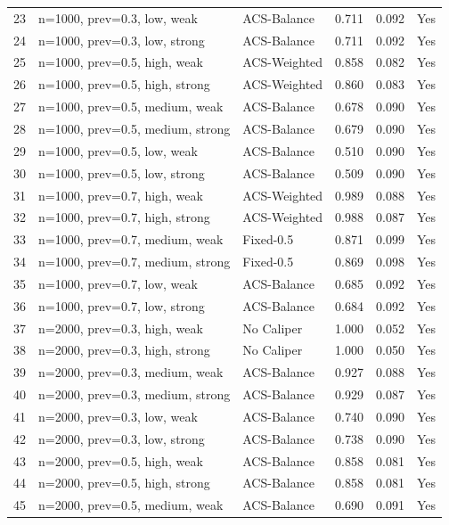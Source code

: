 \begin{tabular}{rlllll}
23 & n=1000, prev=0.3, low, weak & ACS-Balance & 0.711 & 0.092 & Yes \\
24 & n=1000, prev=0.3, low, strong & ACS-Balance & 0.711 & 0.092 & Yes \\
25 & n=1000, prev=0.5, high, weak & ACS-Weighted & 0.858 & 0.082 & Yes \\
26 & n=1000, prev=0.5, high, strong & ACS-Weighted & 0.860 & 0.083 & Yes \\
27 & n=1000, prev=0.5, medium, weak & ACS-Balance & 0.678 & 0.090 & Yes \\
28 & n=1000, prev=0.5, medium, strong & ACS-Balance & 0.679 & 0.090 & Yes \\
29 & n=1000, prev=0.5, low, weak & ACS-Balance & 0.510 & 0.090 & Yes \\
30 & n=1000, prev=0.5, low, strong & ACS-Balance & 0.509 & 0.090 & Yes \\
31 & n=1000, prev=0.7, high, weak & ACS-Weighted & 0.989 & 0.088 & Yes \\
32 & n=1000, prev=0.7, high, strong & ACS-Weighted & 0.988 & 0.087 & Yes \\
33 & n=1000, prev=0.7, medium, weak & Fixed-0.5 & 0.871 & 0.099 & Yes \\
34 & n=1000, prev=0.7, medium, strong & Fixed-0.5 & 0.869 & 0.098 & Yes \\
35 & n=1000, prev=0.7, low, weak & ACS-Balance & 0.685 & 0.092 & Yes \\
36 & n=1000, prev=0.7, low, strong & ACS-Balance & 0.684 & 0.092 & Yes \\
37 & n=2000, prev=0.3, high, weak & No Caliper & 1.000 & 0.052 & Yes \\
38 & n=2000, prev=0.3, high, strong & No Caliper & 1.000 & 0.050 & Yes \\
39 & n=2000, prev=0.3, medium, weak & ACS-Balance & 0.927 & 0.088 & Yes \\
40 & n=2000, prev=0.3, medium, strong & ACS-Balance & 0.929 & 0.087 & Yes \\
41 & n=2000, prev=0.3, low, weak & ACS-Balance & 0.740 & 0.090 & Yes \\
42 & n=2000, prev=0.3, low, strong & ACS-Balance & 0.738 & 0.090 & Yes \\
43 & n=2000, prev=0.5, high, weak & ACS-Balance & 0.858 & 0.081 & Yes \\
44 & n=2000, prev=0.5, high, strong & ACS-Balance & 0.858 & 0.081 & Yes \\
45 & n=2000, prev=0.5, medium, weak & ACS-Balance & 0.690 & 0.091 & Yes \\

\end{tabular}
